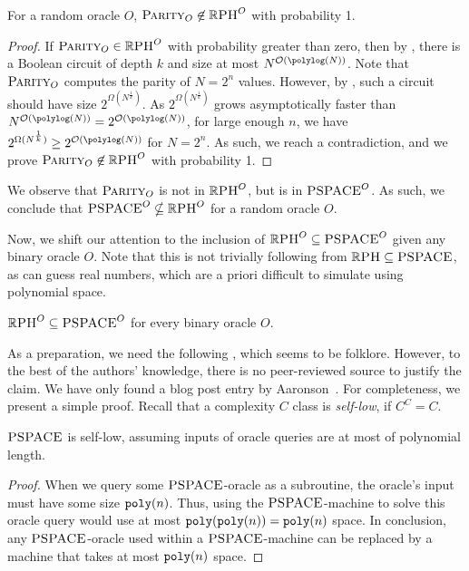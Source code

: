 \documentclass{article}
\begin{document}
\begin{lemma}
    For a random oracle $O$, $\textsc{Parity}_O \not\in \mathbb{R}\textsc{PH}^O$ with probability 1.
\end{lemma}


\begin{proof}
    If $\textsc{Parity}_O \in \mathbb{R}\textsc{PH}^O$ with probability greater than zero, then by , there is a Boolean circuit of depth $k$ and size at most $N^{\bigO(\polylog(N))}$.
    Note that $\textsc{Parity}_O$ computes the parity of $N=2^n$ values.
    However, by , such a circuit should have size \(2^{\Omega(N^\frac{1}{k})}\).
    As \(2^{\Omega(N^\frac{1}{k})}\) grows asymptotically faster than $N^{\bigO(\polylog(N))}=2^{\bigO(\polylog(N))}$,
    for large enough $n$, we have \(2^{\Omega(N^\frac{1}{k})} \geq 2^{\bigO(\polylog(N))}\) for $N=2^n$.
    As such, we reach a contradiction, and we prove $\textsc{Parity}_O \not\in \mathbb{R}\textsc{PH}^O$ with probability 1.
\end{proof}

We observe that $\textsc{Parity}_O$ is not in $\mathbb{R}\textsc{PH}^O$, but is in $\textsc{PSPACE}^O$.
As such, we conclude that $\textsc{PSPACE}^O \nsubseteq \mathbb{R}\textsc{PH}^O$ for a random oracle $O$.


Now, we shift our attention to the inclusion of $\mathbb{R}\textsc{PH}^O \subseteq \textsc{PSPACE}^O$ given any binary oracle $O$.
Note that this is not trivially following from 
$\mathbb{R}\textsc{PH} \subseteq \textsc{PSPACE}$, as \RPH can guess real numbers, which are a priori difficult to simulate using polynomial space.

\begin{lemma}
    \label{lem:RPHSubsetPSPACE}
    $\mathbb{R}\textsc{PH}^O\subseteq\textsc{PSPACE}^O$ for every binary oracle $O$.
\end{lemma}

As a preparation, we need the following ,
which seems to be folklore.
However, to the best of the authors' knowledge, there is no peer-reviewed source to justify the claim. 
We have only found a blog post entry by Aaronson~\cite{aaronson2014lens}.
For completeness, we present a simple proof.
Recall that a complexity $C$ class is \textit{self-low}, if $C^C = C$.
\begin{lemma}
    \label{lem:PSPACESelfLow}
    $\textsc{PSPACE}$ is self-low, assuming inputs of oracle queries are at most of polynomial length.
\end{lemma}

\begin{proof}
    When we query some $\textsc{PSPACE}$-oracle as a subroutine, the oracle's input must have some size $\texttt{poly}(n)$.
    Thus, using the $\textsc{PSPACE}$-machine to solve this oracle query would use at most $\texttt{poly}(\texttt{poly}(n))=\texttt{poly}(n)$ space.
    In conclusion, any $\textsc{PSPACE}$-oracle used within a $\textsc{PSPACE}$-machine can be replaced by a machine that takes at most $\texttt{poly}(n)$ space.
\end{proof}
\end{document}
